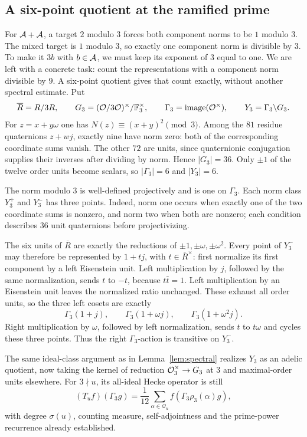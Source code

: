 \subsection{A six-point quotient at the ramified prime}
For $\AA+\AA$, a target $2$ modulo $3$ forces both component norms
to be $1$ modulo $3$. The mixed target is $1$ modulo $3$, so exactly one
component norm is divisible by $3$. To make it $3b$ with $b\in\AA$,
we must keep its exponent of $3$ equal to one. We are left with a concrete
task: count the representations with a component norm divisible by $9$.
A six-point quotient gives that count exactly, without another spectral
estimate. Put
\[
\overline R=R/3R,\qquad
G_3=(\OO/3\OO)^\times/\F_3^\times,\qquad
\Gamma_3=\operatorname{image}(\OO^\times),\qquad
Y_3=\Gamma_3\backslash G_3.
\]
For $z=x+y\omega$ one has $N(z)\equiv(x+y)^2\pmod3$. Among the $81$
residue quaternions $z+w j$, exactly nine have norm zero: both of the
corresponding coordinate sums vanish. The other $72$ are units, since
quaternionic conjugation supplies their inverses after dividing by norm.
Hence $|G_3|=36$. Only $\pm1$ of the twelve order units become scalars,
so $|\Gamma_3|=6$ and $|Y_3|=6$.

The norm modulo $3$ is well-defined projectively and is one on
$\Gamma_3$. Each norm class $Y_3^+$ and $Y_3^-$ has three points.
Indeed, norm one occurs when exactly one of the two coordinate sums is
nonzero, and norm two when both are nonzero; each condition describes
$36$ unit quaternions before projectivizing.

The six units of $\overline R$ are exactly the reductions of
$\pm1,\pm\omega,\pm\omega^2$. Every point of $Y_3^-$ may therefore be
represented by $1+t j$, with $t\in\overline R^\times$: first normalize
its first component by a left Eisenstein unit. Left multiplication by
$j$, followed by the same normalization, sends $t$ to $-t$, because
$t\bar t=1$. Left multiplication by an Eisenstein unit leaves the
normalized ratio unchanged. These exhaust all order units, so the three
left cosets are exactly
\[
\Gamma_3(1+j),\qquad
\Gamma_3(1+\omega j),\qquad
\Gamma_3(1+\omega^2j).
\]
Right multiplication by $\omega$, followed by left normalization, sends
$t$ to $t\omega$ and cycles these three points. Thus the right
$\Gamma_3$-action is transitive on $Y_3^-$.

The same ideal-class argument as in Lemma~\ref{lem:spectral} realizes
$Y_3$ as an adelic quotient, now taking the kernel of reduction
$\OO_3^\times\to G_3$ at $3$ and maximal-order units elsewhere.
For $3\nmid u$, its all-ideal Hecke operator is still
\[
(T_uf)(\Gamma_3 g)=\frac1{12}\sum_{\alpha\in\mathcal Q_u}
 f(\Gamma_3\rho_3(\alpha)g),
\]
with degree $\sigma(u)$, counting measure, self-adjointness and the
prime-power recurrence already established.

